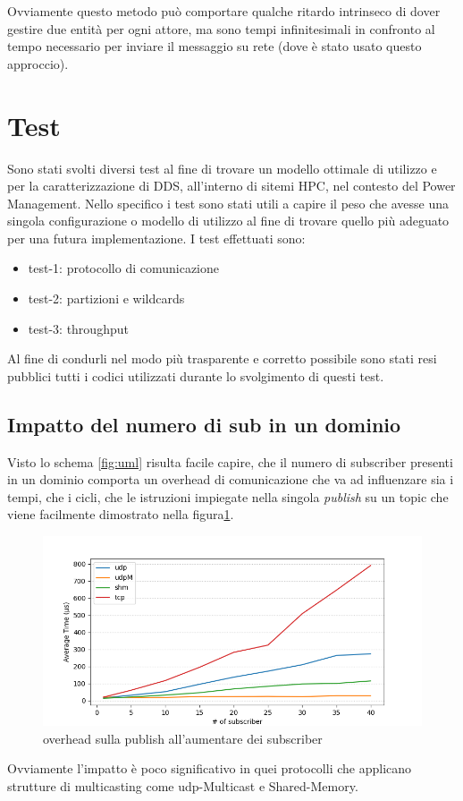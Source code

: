 Ovviamente questo metodo può comportare qualche ritardo intrinseco di dover gestire due entità per ogni attore, ma sono tempi infinitesimali in confronto al tempo necessario per inviare il messaggio su rete (dove è stato usato questo approccio).

\section{Test}
Sono stati svolti diversi test al fine di trovare un modello ottimale di utilizzo e per la caratterizzazione di DDS, all'interno di sitemi HPC, nel contesto del Power Management. Nello specifico i test sono stati utili a capire il peso che avesse una singola configurazione o modello di utilizzo al fine di trovare quello più adeguato per una futura implementazione. I test effettuati sono:

\begin{itemize}
    \item test-1: protocollo di comunicazione
    \item test-2: partizioni e wildcards
    \item test-3: throughput
\end{itemize}


Al fine di condurli nel modo più trasparente e corretto possibile sono stati resi pubblici \cite{mygit} tutti i codici utilizzati durante lo svolgimento di questi test. %


\subsection{Impatto del numero di sub in un dominio}
Visto lo schema \ref{fig:uml} risulta facile capire, che il numero di subscriber presenti in un dominio comporta un overhead di comunicazione che va ad influenzare sia i tempi, che i cicli, che le istruzioni impiegate nella singola \emph{publish} su un topic che viene facilmente dimostrato nella figura\ref{fig:test3_overhead}.
\begin{figure}[H]
    \centering
    \includegraphics[width=\textwidth]{./results/test3_sending_multiplesub.png} %
    \caption{overhead sulla publish all'aumentare dei subscriber}
    \label{fig:test3_overhead}
\end{figure}
Ovviamente l'impatto è poco significativo in quei protocolli che applicano strutture di \gls{multicasting} come udp-Multicast e Shared-Memory. 

